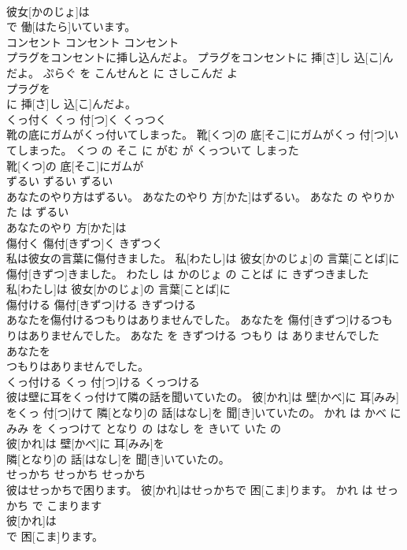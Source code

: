 \documentclass[8pt]{extreport}
\begin{document}
\begin{CJK}{UTF8}{min}
\\	彼女[かのじょ]は
\\	で 働[はたら]いています。			
\\	コンセント	コンセント	コンセント	
\\	プラグをコンセントに挿し込んだよ。	プラグをコンセントに 挿[さ]し 込[こ]んだよ。	ぷらぐ を こんせんと に さしこんだ よ	
\\	プラグを
\\	に 挿[さ]し 込[こ]んだよ。			
\\	くっ付く	くっ 付[つ]く	くっつく	
\\	靴の底にガムがくっ付いてしまった。	靴[くつ]の 底[そこ]にガムがくっ 付[つ]いてしまった。	くつ の そこ に がむ が くっついて しまった	
\\	靴[くつ]の 底[そこ]にガムが
\\	ずるい	ずるい	ずるい	
\\	あなたのやり方はずるい。	あなたのやり 方[かた]はずるい。	あなた の やりかた は ずるい	
\\	あなたのやり 方[かた]は
\\	傷付く	傷付[きずつ]く	きずつく	
\\	私は彼女の言葉に傷付きました。	私[わたし]は 彼女[かのじょ]の 言葉[ことば]に 傷付[きずつ]きました。	わたし は かのじょ の ことば に きずつきました	
\\	私[わたし]は 彼女[かのじょ]の 言葉[ことば]に
\\	傷付ける	傷付[きずつ]ける	きずつける	
\\	あなたを傷付けるつもりはありませんでした。	あなたを 傷付[きずつ]けるつもりはありませんでした。	あなた を きずつける つもり は ありませんでした	
\\	あなたを
\\	つもりはありませんでした。			
\\	くっ付ける	くっ 付[つ]ける	くっつける	
\\	彼は壁に耳をくっ付けて隣の話を聞いていたの。	彼[かれ]は 壁[かべ]に 耳[みみ]をくっ 付[つ]けて 隣[となり]の 話[はなし]を 聞[き]いていたの。	かれ は かべ に みみ を くっつけて となり の はなし を きいて いた の	
\\	彼[かれ]は 壁[かべ]に 耳[みみ]を
\\	隣[となり]の 話[はなし]を 聞[き]いていたの。			
\\	せっかち	せっかち	せっかち	
\\	彼はせっかちで困ります。	彼[かれ]はせっかちで 困[こま]ります。	かれ は せっかち で こまります	
\\	彼[かれ]は
\\	で 困[こま]ります。			

\end{CJK}
\end{document}
